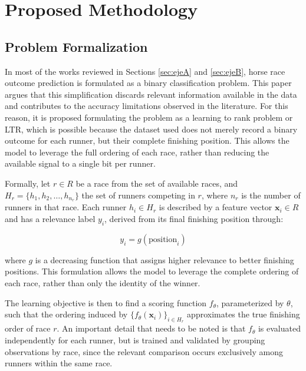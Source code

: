 \section{Proposed Methodology}
\label{sec:methodology}

\subsection{Problem Formalization}

In most of the works reviewed in Sections \ref{sec:ejeA} and \ref{sec:ejeB}, horse race outcome prediction is formulated as a binary classification problem. This paper argues that this simplification discards relevant information available in the data and contributes to the accuracy limitations observed in the literature. For this reason, it is proposed formulating the problem as a learning to rank problem or LTR, which is possible because the dataset used does not merely record a binary outcome for each runner, but their complete finishing position. This allows the model to leverage the full ordering of each race, rather than reducing the available signal to a single bit per runner.

Formally, let $r \in R$ be a race from the set of available races, and $H_r = \{h_1, h_2, \dots, h_{n_r}\}$ the set of runners competing in $r$, where $n_r$ is the number of runners in that race. Each runner $h_i \in H_r$ is described by a feature vector $\mathbf{x}_i \in R $ and has a relevance label $y_i$, derived from its final finishing position through:

\begin{equation}
y_i = g(\text{position}_i)
\end{equation}

where $g$ is a decreasing function that assigns higher relevance to better finishing positions. This formulation allows the model to leverage the complete ordering of each race, rather than only the identity of the winner.

The learning objective is then to find a scoring function $f_\theta $, parameterized by $\theta$, such that the ordering induced by $\{f_\theta(\mathbf{x}_i)\}_{i \in H_r}$ approximates the true finishing order of race $r$. An important detail that needs to be noted is that $f_\theta$ is evaluated independently for each runner, but is trained and validated by grouping observations by race, since the relevant comparison occurs exclusively among runners within the same race.

